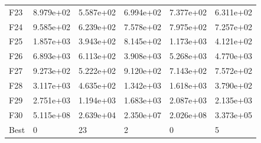 \begin{tabular}{llllll}
F23  &  8.979e+02 &  5.587e+02 &  6.994e+02 &  7.377e+02 &  6.311e+02 \\
F24  &  9.585e+02 &  6.239e+02 &  7.578e+02 &  7.975e+02 &  7.257e+02 \\
F25  &  1.857e+03 &  3.943e+02 &  8.145e+02 &  1.173e+03 &  4.121e+02 \\
F26  &  6.893e+03 &  6.113e+02 &  3.908e+03 &  5.268e+03 &  4.770e+03 \\
F27  &  9.273e+02 &  5.222e+02 &  9.120e+02 &  7.143e+02 &  7.572e+02 \\
F28  &  3.117e+03 &  4.635e+02 &  1.342e+03 &  1.618e+03 &  3.790e+02 \\
F29  &  2.751e+03 &  1.194e+03 &  1.683e+03 &  2.087e+03 &  2.135e+03 \\
F30  &  5.115e+08 &  2.639e+04 &  2.350e+07 &  2.026e+08 &  3.373e+05 \\
Best &          0 &         23 &          2 &          0 &          5 \\
\bottomrule
\end{tabular}
